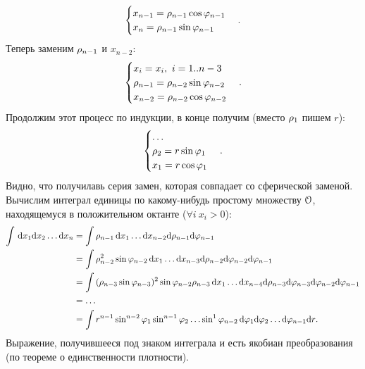{\begin{example}
\begin{itemize}
\[\begin{cases}
                    x_{n - 1} = \rho_{n - 1} \cos{\varphi_{n - 1}} \\
                    x_n = \rho_{n - 1} \sin{\varphi_{n - 1}}
                \end{cases}
            .\]
            Теперь заменим $\rho_{n - 1}$ и $x_{n - 2}$:
            \[
                \begin{cases}
                    x_i = x_i,~ i = 1..{n-3} \\
                    \rho_{n - 1} = \rho_{n - 2} \sin{\varphi_{n - 2}} \\
                    x_{n - 2} = \rho_{n - 2} \cos{\varphi_{n - 2}}
                \end{cases}
            .\]
            Продолжим этот процесс по индукции, в конце получим (вместо $\rho_1$ пишем $r$):
            \[
                \begin{cases}
                    \ldots \\
                    \rho_2 = r \sin{\varphi_1} \\
                    x_1 = r \cos{\varphi_1}
                \end{cases}
            .\]
            Видно, что получилавь серия замен, которая совпадает со сферической заменой.
            Вычислим интеграл единицы по какому-нибудь простому множеству $\mathcal{O}$, находящемуся в
            положительном октанте ($\forall i~ x_i > 0$):
            \begin{align*}
                \int\limits{\,\mathrm{d}x_1 \mathrm{d}x_2 \ldots \mathrm{d}x_n} 
                &= \int\limits{\rho_{n - 1} \,\mathrm{d}x_1 \ldots \mathrm{d}x_{n - 2} \mathrm{d}\rho_{n - 1} \mathrm{d}\varphi_{n - 1}} \\
                &= \int\limits{\rho^2_{n - 2} \sin{\varphi_{n - 2}} \,\mathrm{d}x_1 \ldots \mathrm{d}x_{n - 3} \mathrm{d}\rho_{n - 2} 
                    \mathrm{d}\varphi_{n - 2} \mathrm{d}\varphi_{n - 1}} \\
                &= \int\limits{(\rho_{n - 3} \sin{\varphi_{n - 3}})^2 \sin{\varphi_{n - 2}} \rho_{n - 3} 
                    \,\mathrm{d}x_1 \ldots \mathrm{d}x_{n - 4} \mathrm{d}\rho_{n - 3} \mathrm{d}\varphi_{n - 3} \mathrm{d}\varphi_{n - 2} \mathrm{d}\varphi_{n - 1}} \\
                &= \ldots \\
                &= \int\limits{r^{n - 1} \sin^{n - 2}{\varphi_1} \sin^{n - 1}{\varphi_2} \ldots \sin^1{\varphi_{n - 2}}
                    \,\mathrm{d}\varphi_1 \mathrm{d}\varphi_2 \ldots \mathrm{d}\varphi_{n - 1} \mathrm{d}r} 
            .\end{align*}
            Выражение, получившееся под знаком интеграла и есть якобиан преобразования (по теореме о
            единственности плотности).
    \end{itemize}
\end{example}

}
